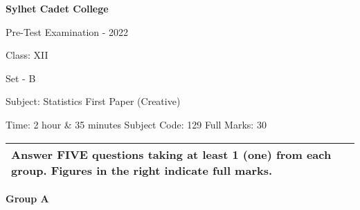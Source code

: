\documentclass{article}
\begin{document}
\begin{center}
  \bfseries\large
  Sylhet Cadet College

\normalsize
  Pre-Test Examination - 2022

  Class: XII
  
  Set - B

  Subject: Statistics First Paper (Creative)

  Time: 2 hour \& 35 minutes \qquad \qquad \qquad Subject Code: 129  \qquad  \qquad \qquad Full Marks: 30

\end{center}

\noindent
\begin{tabular}{p{\dimexpr\linewidth-2\tabcolsep}}
  Answer FIVE questions taking at least 1 (one) from each group. Figures in the right indicate full marks.\\
  \hline
\end{tabular}

\begin{center}
\textbf{Group A}
\end{center}
\end{document}

